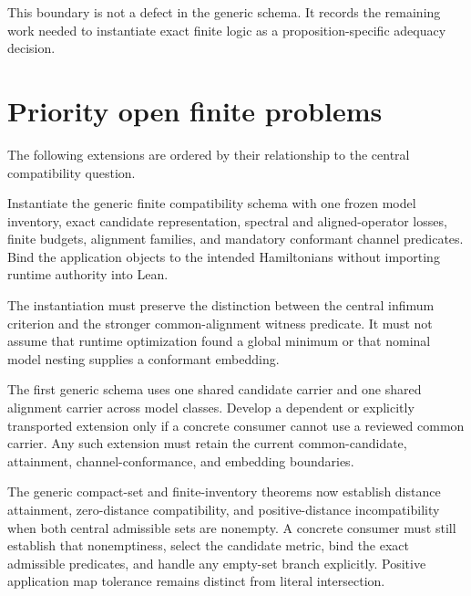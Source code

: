 This boundary is not a defect in the generic schema.  It records the remaining work
needed to instantiate exact finite logic as a proposition-specific adequacy decision.

\section{Priority open finite problems}

The following extensions are ordered by their relationship to the central compatibility
question.

\begin{openproblem}
Instantiate the generic finite compatibility schema with one frozen model inventory,
exact candidate representation, spectral and aligned-operator losses, finite budgets,
alignment families, and mandatory conformant channel predicates.  Bind the application
objects to the intended Hamiltonians without importing runtime authority into Lean.
\end{openproblem}

The instantiation must preserve the distinction between the central infimum criterion
and the stronger common-alignment witness predicate.  It must not assume that runtime
optimization found a global minimum or that nominal model nesting supplies a conformant
embedding.

\begin{openproblem}
The first generic schema uses one shared candidate carrier and one shared alignment
carrier across model classes.  Develop a dependent or explicitly transported extension
only if a concrete consumer cannot use a reviewed common carrier.  Any such extension
must retain the current common-candidate, attainment, channel-conformance, and embedding
boundaries.
\end{openproblem}

\begin{openproblem}
The generic compact-set and finite-inventory theorems now establish distance attainment,
zero-distance compatibility, and positive-distance incompatibility when both central
admissible sets are nonempty.  A concrete consumer must still establish that nonemptiness,
select the candidate metric, bind the exact admissible predicates, and handle any empty-set
branch explicitly.  Positive application map tolerance remains distinct from literal
intersection.
\end{openproblem}

